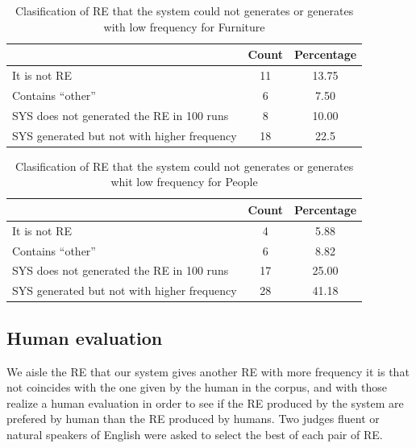 \begin{table}[h!]
\begin{center}
\begin{tabular}{|l|c|c|}
\hline
		& Count		& Percentage\\
\hline
It is not RE	&	11	&	13.75 \\
Contains ``other''	&	6	&	7.50 \\
\hline
SYS does not generated the RE in 100 runs	&	8	&	10.00 \\
SYS generated but not with higher frequency	&	18	&	22.5 \\
\hline
\end{tabular}
\caption{Clasification of RE that the system could not generates or generates with low frequency for Furniture}
\label{error-people}
\end{center}
\end{table}

\begin{table}[h!]
\begin{center}
\begin{tabular}{|l|c|c|}
\hline
			& Count		& Percentage\\
\hline
It is not RE		&	4	&	5.88 \\
Contains ``other''	&	6	&	8.82 \\
\hline
SYS does not generated the RE in 100 runs	&	17	&	25.00 \\
SYS generated but not with higher frequency	&	28	&	41.18 \\

\hline
\end{tabular}
\caption{Clasification of RE that the system could not generates or generates whit low frequency for People}
\label{error-furniture}
\end{center}
\end{table}
\subsection{Human evaluation} \label{sec:evaluation}

We aisle the RE that our system gives another RE with more frequency it is that not coincides with the one given by the human in the corpus, and with those realize a human evaluation in order to see if the RE produced by the system are prefered by human than the RE produced by humans. Two judges fluent or natural speakers of English were asked to select the best of each pair of RE.

